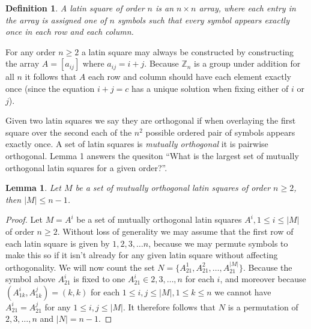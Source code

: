 \documentclass{article}
\newtheorem{lemma}{Lemma}
\newtheorem{definition}{Definition}
\begin{document}
    \begin{definition}
        A latin square of order \(n\) is an \(n \times n\) array, where each entry in the array is assigned one of \(n\) symbols such that every symbol appears exactly once in each row and each column.
    \end{definition}

    For any order \(n \geq 2\) a latin square may always be constructed by constructing the array \(A = [a_{ij}]\) where \(a_{ij} = i + j\). Because \(\mathbb{Z}_n\) is a group under addition for all \(n\) it follows that \(A\) each row and column should have each element exactly once (since the equation \(i + j = c\) has a unique solution when fixing either of \(i\) or \(j\)).

    Given two latin squares we say they are orthogonal if when overlaying the first square over the second each of the \(n^2\) possible ordered pair of symbols appears exactly once.
    A set of latin squares is \textit{mutually orthogonal} it is pairwise orthogonal. Lemma 1 answers the quesiton ``What is the largest set of mutually orthogonal latin squares for a given order?''.

    \begin{lemma}
        Let \(M\) be a set of mutually orthogonal latin squares of order \(n \geq 2\), then \(|M| \leq n - 1\).
    \end{lemma}
    \begin{proof}
        Let \(M = {A^i}\) be a set of mutually orthogonal latin squares \(A^i, 1 \leq i \leq |M|\) of order \(n \geq 2\). Without loss of generality we may assume that the first row of each latin square is given by \(1, 2, 3, \ldots n\), because we may permute symbols to make this so if it isn't already for any given latin square without affecting orthogonality.
        We will now count the set \(N = \{A^1_{21}, A^2_{21}, \ldots, A^{|M|}_{21}\}\). Because the symbol above \(A^i_{21}\) is fixed to one \(A^i_{21} \in {2, 3, \ldots, n}\) for each \(i\), and moreover because \((A^i_{1k}, A^j_{1k}) = (k, k)\) for each \(1 \leq i, j \leq |M|, 1 \leq k \leq n\) we cannot have \(A^i_{21} = A^j_{21}\) for any \(1 \leq i, j \leq |M|\).
        It therefore follows that \(N\) is a permutation of \({2, 3, \ldots, n}\) and \(|N| = n - 1\).
    \end{proof}
\end{document}
